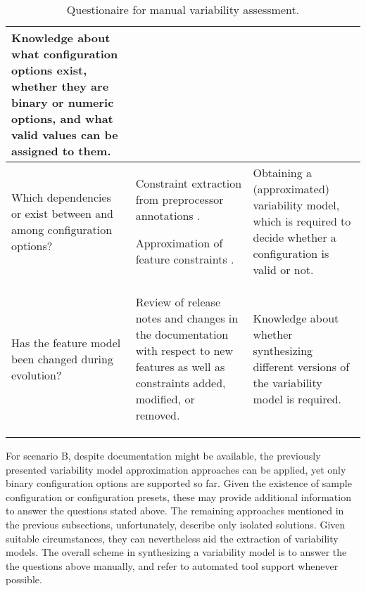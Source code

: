 \begin{sidewaystable}
\begin{tabular}{L{0.25\textwidth} L{0.45\textwidth} L{0.3\textwidth}}
	{Knowledge about what configuration options exist, whether they are binary or
	numeric options, and what valid values can be assigned to them.}\\
	
	\midrule
	
	{Which dependencies or exist between and among configuration options?} & 
	
	{\small\begin{compactitem}
	  \item Constraint extraction from preprocessor annotations
	  \citep{nadi_mining_2014,nadi_where_2015}.
	  \item Approximation of feature constraints
	  \citep{lopez-herrejon_reverse_2012,linsbauer_feature_2014}.
	\end{compactitem}} & 
	
	{Obtaining a (approximated) variability model, which is required to decide
	whether a configuration is valid or not.}\\
	
	\midrule
	
	{Has the feature model been changed during evolution?} & 
	
	{\small\begin{compactitem} 
		\item Review of release notes and changes in the documentation with respect to
		new features as well as constraints added, modified, or removed. 
	\end{compactitem}} & 
	
	{Knowledge about whether synthesizing different versions of the variability
	model is required.}\\
    \bottomrule
  \end{tabular}
  \caption{Questionaire for manual variability
  assessment.}\label{tab:manual_var_assessment}
\end{sidewaystable}

For scenario B, despite documentation might be available, the
previously presented variability model approximation approaches
\citep{haslinger_reverse_2011,haslinger_extracting_2013,lopez-herrejon_reverse_2012,linsbauer_feature_2014}
can be applied, yet only binary configuration options are supported so far.
Given the existence of sample configuration or configuration presets, these
may provide additional information to answer the questions stated above. 
The remaining approaches mentioned in the previous subsections, unfortunately,
describe only isolated solutions. Given suitable circumstances, they can
nevertheless aid the extraction of variability models. The overall scheme in
synthesizing a variability model is to answer the the questions above manually,
and refer to automated tool support whenever possible.



